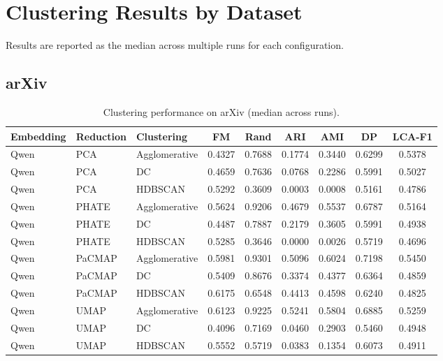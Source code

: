 \section{Clustering Results by Dataset}
\label{sec:appendix_clustering}

Results are reported as the median across multiple runs for each configuration.

\setlength{\tabcolsep}{4pt}
\renewcommand{\arraystretch}{1.1}

\subsection{arXiv}
\begin{table}[t]
\centering
\caption{Clustering performance on arXiv (median across runs).}
\begin{tabular}{lllcccccc}
\toprule
Embedding & Reduction & Clustering & FM & Rand & ARI & AMI & DP & LCA-F1 \\
\midrule

Qwen & PCA & Agglomerative & 0.4327 & 0.7688 & 0.1774 & 0.3440 & 0.6299 & 0.5378 \\
Qwen & PCA & DC & 0.4659 & 0.7636 & 0.0768 & 0.2286 & 0.5991 & 0.5027 \\
Qwen & PCA & HDBSCAN & 0.5292 & 0.3609 & 0.0003 & 0.0008 & 0.5161 & 0.4786 \\

Qwen & PHATE & Agglomerative & 0.5624 & 0.9206 & 0.4679 & 0.5537 & 0.6787 & 0.5164 \\
Qwen & PHATE & DC & 0.4487 & 0.7887 & 0.2179 & 0.3605 & 0.5991 & 0.4938 \\
Qwen & PHATE & HDBSCAN & 0.5285 & 0.3646 & 0.0000 & 0.0026 & 0.5719 & 0.4696 \\

Qwen & PaCMAP & Agglomerative & 0.5981 & 0.9301 & 0.5096 & 0.6024 & 0.7198 & 0.5450 \\
Qwen & PaCMAP & DC & 0.5409 & 0.8676 & 0.3374 & 0.4377 & 0.6364 & 0.4859 \\
Qwen & PaCMAP & HDBSCAN & 0.6175 & 0.6548 & 0.4413 & 0.4598 & 0.6240 & 0.4825 \\

Qwen & UMAP & Agglomerative & 0.6123 & 0.9225 & 0.5241 & 0.5804 & 0.6885 & 0.5259 \\
Qwen & UMAP & DC & 0.4096 & 0.7169 & 0.0460 & 0.2903 & 0.5460 & 0.4948 \\
Qwen & UMAP & HDBSCAN & 0.5552 & 0.5719 & 0.0383 & 0.1354 & 0.6073 & 0.4911 \\


\end{tabular}
\end{table}
